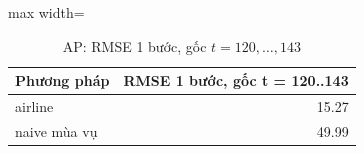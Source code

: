 \begin{table}[H]
\centering\footnotesize
\caption{AP: RMSE 1 bước, gốc $t=120,\dots,143$}\label{tab:tab_b12_12_ap_one_step}
\begin{adjustbox}{max width=\linewidth}
\begin{tabular}{|l|r|}
\toprule
Phương pháp & RMSE 1 bước, gốc t = 120..143 \\
\midrule
airline & 15.27 \\
naive mùa vụ & 49.99 \\
\bottomrule
\end{tabular}
\end{adjustbox}
\end{table}
